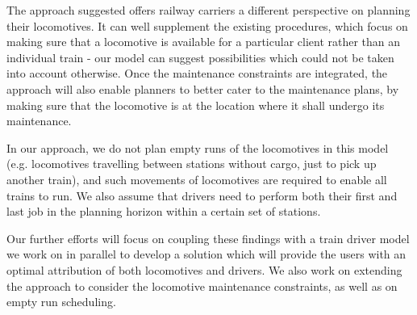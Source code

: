 
The approach suggested offers railway carriers a different perspective on planning their locomotives. It can well supplement the existing procedures, which focus on making sure that a locomotive is available for a particular client rather than an individual train - our model can suggest possibilities which could not be taken into account otherwise. Once the maintenance constraints are integrated, the approach will also enable planners to better cater to the maintenance plans, by making sure that the locomotive is at the location where it shall undergo its maintenance. 

In our approach, we do not plan empty runs of the locomotives in this model (e.g. locomotives travelling between stations without cargo, just to pick up another train), and such movements of locomotives are required to enable all trains to run. We also assume that drivers need to perform both their first and last job in the planning horizon within a certain set of stations. 

Our further efforts will focus on coupling these findings with a train driver model we work on in parallel to develop a solution which will provide the users with an optimal attribution of both locomotives and drivers. We also work on extending the approach to consider the locomotive maintenance constraints, as well as on empty run scheduling.
